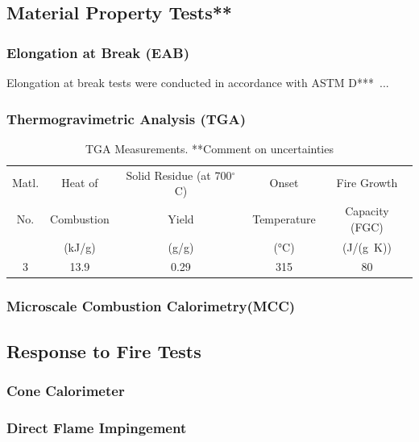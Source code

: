 \subsection{Material Property Tests**}
\subsubsection{Elongation at Break (EAB)}

Elongation at break tests were conducted in accordance with ASTM D***~\cite{}...
\subsubsection{Thermogravimetric Analysis (TGA)}

\begin{table}
	\caption[TGA Measurements]{TGA Measurements. **Comment on uncertainties}
	\label{tab:TGA}
	\begin{minipage}{\textwidth}
		\begin{tabular}{ccccc}
			\hline
			Matl.  & Heat of        & Solid Residue (at 700$^\circ$C)   & Onset              & Fire Growth             \\
			No.    & Combustion     & Yield            & Temperature        & Capacity (FGC)          \\
			& (kJ/g)         & (g/g)            & (°C)               & (J/(g~K))               \\ \hline
			3      &  13.9          & 0.29             & 315     & 80             \\
			\hline
		\end{tabular}
	\end{minipage}
\end{table}

\subsubsection{Microscale Combustion Calorimetry(MCC)}


\subsection{Response to Fire Tests}
\subsubsection{Cone Calorimeter}
\subsubsection{Direct Flame Impingement}


